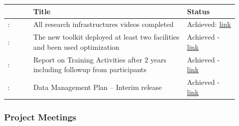 {\fontsize{9}{11}\selectfont
\begin{center}
  \begin{tabular}[t]{!{\color{mygray}\vrule}p{0.10\linewidth}!
  {\color{mygray}\vrule}p{0.60\linewidth}!
  {\color{mygray}\vrule}p{0.20\linewidth}!{\color{mygray}\vrule} } \hline
     & {\bf Title} & {\bf Status} \\ 

    \hline
    : & All research  infrastructures videos completed & Achieved: \href{https://zenodo.org/records/13809706?token=eyJhbGciOiJIUzUxMiJ9.eyJpZCI6IjFlZDBjMGVjLTYwYTYtNDA1My05MzA4LTliNTBmNjM0MzBmYyIsImRhdGEiOnt9LCJyYW5kb20iOiJjNDg2NjYwNTU2NzRlNzJjOGY5ZDhlZjg4Y2M5MTQ1YSJ9.Y7J8-K4wzJWZYSd4l0yPD-T9264mA2Rnv2rIoUFZBgcHyFiPE7P060igOMvcmUoaDr9fifh4Ii4rIZpoD-3DAw}{link} \\
    \hline
    : & The new toolkit deployed at least two facilities and been used optimization  & Achieved - \href{https://zenodo.org/records/13809056?token=eyJhbGciOiJIUzUxMiJ9.eyJpZCI6IjU1MjNhZWUzLTlhNTktNDM1Yy1hMGNiLTIyNzBkMWU5NmNkOSIsImRhdGEiOnt9LCJyYW5kb20iOiI0NzcxZmR}{link} \\
    \hline
    : & Report on Training Activities after 2 years including followup from participants & Achieved - \href{https://zenodo.org/records/13810050?token=eyJhbGciOiJIUzUxMiJ9.eyJpZCI6ImEzNDI2OGU5LTg2MDItNDVkNC05NTAwLTgxOGFkMjAzMDRjMiIsImRhdGEiOnt9LCJyYW5kb20iOiJhNTU5ZmUxOTVkODgzZjhmM2ZmZTg1MmI0NTAyY2FjYiJ9.mRs0T6IPIT6cs8CH1k34B5Ghd5xtmtgWhaTkf9UZslTtLRfI4PM890lS6GgU-S27uwfyVg3jou2jWB8eSzup5Q}{link} \\ 
    \hline
    : & Data Management Plan – Interim release  & Achieved - \href{https://zenodo.org/records/14277086}{link} \\ 
    \hline
  \end{tabular}
\end{center}
}

\subsubsection*{Project Meetings}

